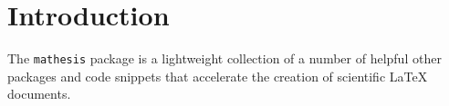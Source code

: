 \section{Introduction}
The \verb|mathesis| package is a lightweight collection of a number of helpful other packages and code snippets that accelerate the creation of scientific LaTeX documents. 
